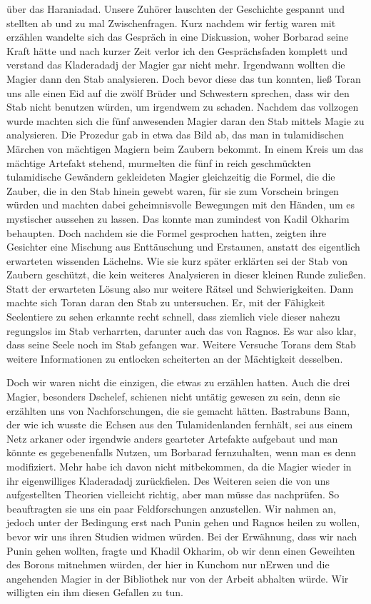 über das Haraniadad. Unsere Zuhörer lauschten der Geschichte gespannt und stellten ab und zu mal Zwischenfragen. Kurz nachdem wir fertig waren mit erzählen wandelte sich das Gespräch in eine Diskussion, woher Borbarad seine Kraft hätte und nach kurzer Zeit verlor ich den Gesprächsfaden komplett und verstand das Kladeradadj der Magier gar nicht mehr. Irgendwann wollten die Magier dann den Stab analysieren. Doch bevor diese das tun konnten, ließ Toran uns alle einen Eid auf die zwölf Brüder und Schwestern sprechen, dass wir den Stab nicht benutzen würden, um irgendwem zu schaden. Nachdem das vollzogen wurde machten sich die fünf anwesenden Magier daran den Stab mittels Magie zu analysieren. Die Prozedur gab in etwa das Bild ab, das man in tulamidischen Märchen von mächtigen Magiern beim Zaubern bekommt. In einem Kreis um das mächtige Artefakt stehend, murmelten die fünf in reich geschmückten tulamidische Gewändern gekleideten Magier gleichzeitig die Formel, die die Zauber, die in den Stab hinein gewebt waren, für sie zum Vorschein bringen würden und machten dabei geheimnisvolle Bewegungen mit den Händen, um es mystischer aussehen zu lassen. Das konnte man zumindest von Kadil Okharim behaupten. Doch nachdem sie die Formel gesprochen hatten, zeigten ihre Gesichter eine Mischung aus Enttäuschung und Erstaunen, anstatt des eigentlich erwarteten wissenden Lächelns. Wie sie kurz später erklärten sei der Stab von Zaubern geschützt, die kein weiteres Analysieren in dieser kleinen Runde zuließen. Statt der erwarteten Lösung also nur weitere Rätsel und Schwierigkeiten. Dann machte sich Toran daran den Stab zu untersuchen. Er, mit der Fähigkeit Seelentiere zu sehen erkannte recht schnell, dass ziemlich viele dieser nahezu regungslos im Stab verharrten, darunter auch das von Ragnos. Es war also klar, dass seine Seele noch im Stab gefangen war. Weitere Versuche Torans dem Stab weitere Informationen zu entlocken scheiterten an der Mächtigkeit desselben.

Doch wir waren nicht die einzigen, die etwas zu erzählen hatten. Auch die drei Magier, besonders Dschelef, schienen nicht untätig gewesen zu sein, denn sie erzählten uns von Nachforschungen, die sie gemacht hätten. Bastrabuns Bann, der wie ich wusste die Echsen aus den Tulamidenlanden fernhält, sei aus einem Netz arkaner oder irgendwie anders gearteter Artefakte aufgebaut und man könnte es gegebenenfalls Nutzen, um Borbarad fernzuhalten, wenn man es denn modifiziert. Mehr habe ich davon nicht mitbekommen, da die Magier wieder in ihr eigenwilliges Kladeradadj zurückfielen. Des Weiteren seien die von uns aufgestellten Theorien vielleicht richtig, aber man müsse das nachprüfen. So beauftragten sie uns ein paar Feldforschungen anzustellen. Wir nahmen an, jedoch unter der Bedingung erst nach Punin gehen und Ragnos heilen zu wollen, bevor wir uns ihren Studien widmen würden. Bei der Erwähnung, dass wir nach Punin gehen wollten, fragte und Khadil Okharim, ob wir denn einen Geweihten des Borons mitnehmen würden, der hier in Kunchom nur nErwen und die angehenden Magier in der Bibliothek nur von der Arbeit abhalten würde. Wir willigten ein ihm diesen Gefallen zu tun.

